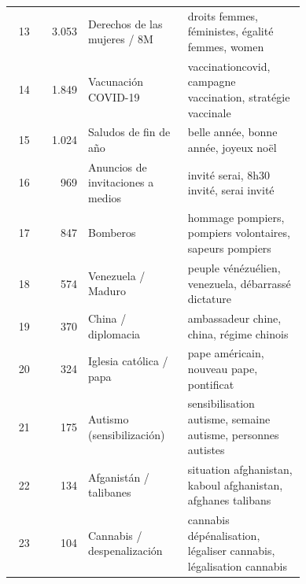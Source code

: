 {\begin{longtable}{@{}r r >{\raggedright\arraybackslash}p{0.34\linewidth} >{\raggedright\arraybackslash}p{0.40\linewidth}@{}}
13 & 3.053 & Derechos de las mujeres / 8M & droits femmes, féministes, égalité femmes, women \\
14 & 1.849 & Vacunación COVID-19 & vaccinationcovid, campagne vaccination, stratégie vaccinale \\
15 & 1.024 & Saludos de fin de año & belle année, bonne année, joyeux noël \\
16 & 969 & Anuncios de invitaciones a medios & invité serai, 8h30 invité, serai invité \\
17 & 847 & Bomberos & hommage pompiers, pompiers volontaires, sapeurs pompiers \\
18 & 574 & Venezuela / Maduro & peuple vénézuélien, venezuela, débarrassé dictature \\
19 & 370 & China / diplomacia & ambassadeur chine, china, régime chinois \\
20 & 324 & Iglesia católica / papa & pape américain, nouveau pape, pontificat \\
21 & 175 & Autismo (sensibilización) & sensibilisation autisme, semaine autisme, personnes autistes \\
22 & 134 & Afganistán / talibanes & situation afghanistan, kaboul afghanistan, afghanes talibans \\
23 & 104 & Cannabis / despenalización & cannabis dépénalisation, légaliser cannabis, légalisation cannabis \\
\end{longtable}
}

